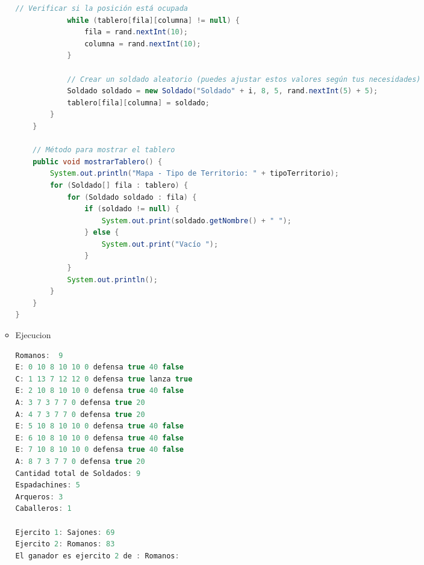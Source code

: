 \documentclass{article}
\begin{document}
\begin{itemize}
\begin{itemize}
\begin{lstlisting}[language=java]
            // Verificar si la posición está ocupada
            while (tablero[fila][columna] != null) {
                fila = rand.nextInt(10);
                columna = rand.nextInt(10);
            }

            // Crear un soldado aleatorio (puedes ajustar estos valores según tus necesidades)
            Soldado soldado = new Soldado("Soldado" + i, 8, 5, rand.nextInt(5) + 5);
            tablero[fila][columna] = soldado;
        }
    }

    // Método para mostrar el tablero
    public void mostrarTablero() {
        System.out.println("Mapa - Tipo de Territorio: " + tipoTerritorio);
        for (Soldado[] fila : tablero) {
            for (Soldado soldado : fila) {
                if (soldado != null) {
                    System.out.print(soldado.getNombre() + " ");
                } else {
                    System.out.print("Vacío ");
                }
            }
            System.out.println();
        }
    }
}
        \end{lstlisting}

        
        \item Ejecucion
        \begin{lstlisting}[language=java]
Romanos:  9
E: 0 10 8 10 10 0 defensa true 40 false
C: 1 13 7 12 12 0 defensa true lanza true
E: 2 10 8 10 10 0 defensa true 40 false
A: 3 7 3 7 7 0 defensa true 20
A: 4 7 3 7 7 0 defensa true 20
E: 5 10 8 10 10 0 defensa true 40 false
E: 6 10 8 10 10 0 defensa true 40 false
E: 7 10 8 10 10 0 defensa true 40 false
A: 8 7 3 7 7 0 defensa true 20
Cantidad total de Soldados: 9
Espadachines: 5
Arqueros: 3
Caballeros: 1

Ejercito 1: Sajones: 69
Ejercito 2: Romanos: 83
El ganador es ejercito 2 de : Romanos:
        \end{lstlisting}

    
	\end{itemize}


\end{itemize}
\end{document}
